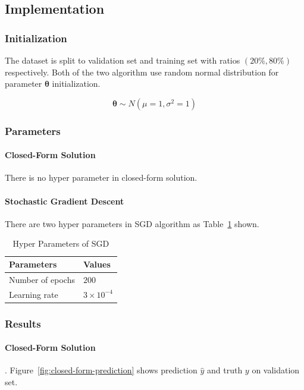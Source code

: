 \documentclass[journal, a4paper]{IEEEtran}
\begin{document}
\subsection{Implementation}
\subsubsection{Initialization}
    The dataset is split to validation set and training set with ratios $(20\%, 80\%)$ respectively. Both of the two algorithm use random normal distribution for parameter $\boldsymbol\theta$ initialization.
    
    $$\boldsymbol\theta \sim N(\mu=1, \sigma^2=1)$$
    
\subsubsection{Parameters}
\paragraph{Closed-Form Solution}
    There is no hyper parameter in closed-form solution.
\paragraph{Stochastic Gradient Descent}
    There are two hyper parameters in SGD algorithm as Table~\ref{tab:sgd-hyperparams} shown.
    \begin{table}[!hbt]
        \begin{center}
            \caption{Hyper Parameters of SGD}
            \label{tab:sgd-hyperparams}
            \begin{tabular}{l|l}
                \hline
                Parameters & Values \\
                \hline
                Number of epochs & $200$ \\
                Learning rate & $3\times 10^{-4}$ \\
                \hline
            \end{tabular}
        \end{center}
    \end{table}
    
\subsubsection{Results}
\paragraph{Closed-Form Solution}
    . Figure~\ref{fig:closed-form-prediction} shows prediction $\hat{y}$ and truth $y$ on validation set.
    
\end{document}
